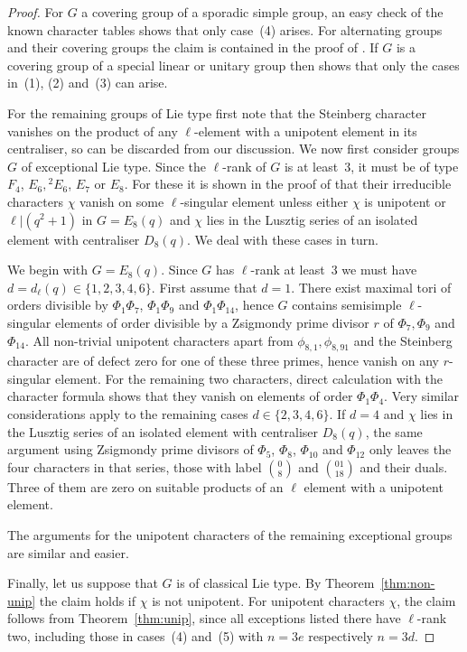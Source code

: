 \documentclass{ert-l}
\newcommand{\tw}[1]{{}^#1\!}
\let\sys=\binom
\theoremstyle{definition}
\theoremstyle{remark}
\begin{document}
\begin{proof}
For $G$ a covering group of a sporadic simple group, an easy check of the
known character tables shows that only case~(4) arises. For alternating groups
and their covering groups the claim is contained in the proof of
\cite[Prop.~4.2 and Thm.~4.5]{LMS13}. If $G$ is a covering group of a
special linear or unitary group then \cite[Thm.~1.3]{LM15} shows that only the
cases in~(1), (2) and~(3) can arise.  \par
For the remaining groups of Lie type first note that the Steinberg character
vanishes on the product of any $\ell$-element with a unipotent element
in its centraliser, so can be discarded from our discussion. We now first
consider groups $G$ of exceptional Lie type. Since the $\ell$-rank of $G$ is
at least~3, it must be of type $F_4$, $E_6,\tw2E_6$, $E_7$ or $E_8$. For
these it is shown in the proof of \cite[Thm.~6.11]{LMS13} that their irreducible
characters $\chi$ vanish on some $\ell$-singular element unless
either $\chi$ is unipotent or $\ell|(q^2+1)$ in $G=E_8(q)$ and $\chi$ lies in
the Lusztig series of an isolated element with centraliser $D_8(q)$. We deal
with these cases in turn.  \par
We begin with $G=E_8(q)$. Since $G$ has $\ell$-rank at least~3 we must have
$d=d_\ell(q)\in\{1,2,3,4,6\}$. First assume that $d=1$.
There exist maximal tori of orders divisible by $\Phi_1\Phi_7$, $\Phi_1\Phi_9$
and $\Phi_1\Phi_{14}$, hence $G$ contains semisimple $\ell$-singular elements
of order divisible by a Zsigmondy prime divisor $r$ of $\Phi_7,\Phi_9$ and
$\Phi_{14}$. All non-trivial unipotent characters apart from
$\phi_{8,1},\phi_{8,91}$ and the Steinberg character are of defect
zero for one of these three primes, hence vanish on any $r$-singular element.
For the remaining two characters, direct calculation with the character formula
shows that they vanish on elements of order $\Phi_1\Phi_4$. Very similar
considerations apply to the remaining cases $d\in\{2,3,4,6\}$. If $d=4$ and
$\chi$ lies in the Lusztig series of an isolated element with centraliser
$D_8(q)$, the same argument using Zsigmondy prime divisors of $\Phi_5$,
$\Phi_8$, $\Phi_{10}$ and $\Phi_{12}$ only leaves the four characters in that
series, those with label $\sys{0}{8}$ and $\sys{0 1}{1 8}$ and their duals.
Three of them are zero on suitable products of an $\ell$ element with a
unipotent element.
\par
The arguments for the unipotent characters of the remaining exceptional groups
are similar and easier. \par
Finally, let us suppose that $G$ is of classical Lie type. By
Theorem~\ref{thm:non-unip} the claim holds if $\chi$ is not
unipotent. For unipotent characters $\chi$, the claim follows from
Theorem~\ref{thm:unip}, since all exceptions listed there have $\ell$-rank
two, including those in cases~(4) and~(5) with $n=3e$ respectively $n=3d$.
\end{proof}
\end{document}
